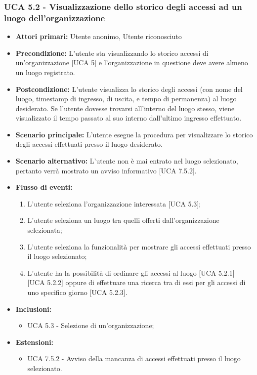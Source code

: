 \subsubsection{UCA 5.2 - Visualizzazione dello storico degli accessi ad un luogo dell'organizzazione}
\begin{itemize}
    \item \textbf{Attori primari:} Utente anonimo, Utente riconosciuto
    \item \textbf{Precondizione:} L'utente sta visualizzando lo storico accessi di un'organizzazione [UCA 5] e l'organizzazione in questione deve avere almeno un luogo registrato.
    \item \textbf{Postcondizione:} L'utente visualizza lo storico degli accessi (con nome del luogo, timestamp di ingresso, di uscita, e tempo di permanenza) al luogo desiderato. Se l'utente dovesse trovarsi all'interno del luogo stesso, viene visualizzato il tempo passato al suo interno dall'ultimo ingresso effettuato.
    \item \textbf{Scenario principale:} L'utente esegue la procedura per visualizzare lo storico degli accessi effettuati presso il luogo desiderato.
    \item \textbf{Scenario alternativo:} L'utente non è mai entrato nel luogo selezionato, pertanto verrà mostrato un avviso informativo [UCA 7.5.2].
    \item \textbf{Flusso di eventi:}
    \begin{enumerate}
        \item L'utente seleziona l'organizzazione interessata [UCA 5.3];
        \item L'utente seleziona un luogo tra quelli offerti dall'organizzazione selezionata;
        \item L'utente seleziona la funzionalità per mostrare gli accessi effettuati presso il luogo selezionato;
        \item L'utente ha la possibilità di ordinare gli accessi al luogo [UCA 5.2.1] [UCA 5.2.2] oppure di effettuare una ricerca tra di essi per gli accessi di uno specifico giorno [UCA 5.2.3].
    \end{enumerate}
    \item \textbf{Inclusioni:}
    \begin{itemize}
        \item UCA 5.3 - Selezione di un'organizzazione;
    \end{itemize}
    \item \textbf{Estensioni:}
    \begin{itemize}
        \item UCA 7.5.2 - Avviso della mancanza di accessi effettuati presso il luogo selezionato.
    \end{itemize}
\end{itemize}

